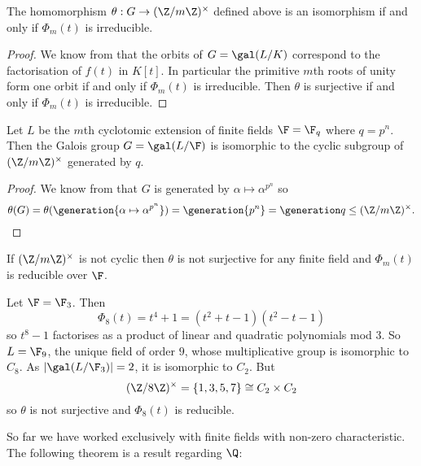 \documentclass[a4paper]{article}
\begin{document}
\begin{lemma}
  \label{lem:irreducibility of cyclotomic}
  The homomorphism \(\theta: G \to (\Z/m\Z)^\times\) defined above is an isomorphism if and only if \(\Phi_m(t)\) is irreducible.
\end{lemma}

\begin{proof}
  We know from  that the orbits of \(G = \gal(L/K)\) correspond to the factorisation of \(f(t)\) in \(K[t]\). In particular the primitive \(m\)th roots of unity form one orbit if and only if \(\Phi_m(t)\) is irreducible. Then \(\theta\) is surjective if and only if \(\Phi_m(t)\) is irreducible.
\end{proof}

\begin{theorem}
  Let \(L\) be the \(m\)th cyclotomic extension of finite fields \(\F = \F_q\) where \(q = p^n\). Then the Galois group \(G = \gal(L/\F)\) is isomorphic to the cyclic subgroup of \((\Z/m\Z)^\times\) generated by \(q\).
\end{theorem}

\begin{proof}
  We know from  that \(G\) is generated by \(\alpha \mapsto \alpha^{p^n}\) so
  \[
    \theta(G) = \theta(\generation{\alpha \mapsto \alpha^{p^n}}) =  \generation{p^n} = \generation q \leq (\Z/m\Z)^\times.
  \]
\end{proof}

\begin{remark}
  If \((\Z/m\Z)^\times\) is not cyclic then \(\theta\) is not surjective for any finite field and \(\Phi_m(t)\) is reducible over \(\F\).
\end{remark}

\begin{eg}
  Let \(\F = \F_3\). Then
  \[
    \Phi_8(t) =  t^4 + 1 = (t^2 + t - 1)(t^2 - t - 1)
  \]
  so \(t^8 - 1\) factorises as a product of linear and quadratic polynomials mod \(3\). So \(L = \F_9\), the unique field of order \(9\), whose multiplicative group is isomorphic to \(C_8\). As \(|\gal(L/\F_3)| = 2\), it is isomorphic to \(C_2\). But
  \[
    (\Z/8\Z)^\times = \{1, 3, 5, 7\} \cong C_2 \times C_2
  \]
  so \(\theta\) is not surjective and \(\Phi_8(t)\) is reducible.
\end{eg}

So far we have worked exclusively with finite fields with non-zero characteristic. The following theorem is a result regarding \(\Q\):
\end{document}
